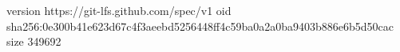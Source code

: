 version https://git-lfs.github.com/spec/v1
oid sha256:0e300b41e623d67c4f3aeebd5256448ff4c59ba0a2a0ba9403b886e6b5d50cac
size 349692
